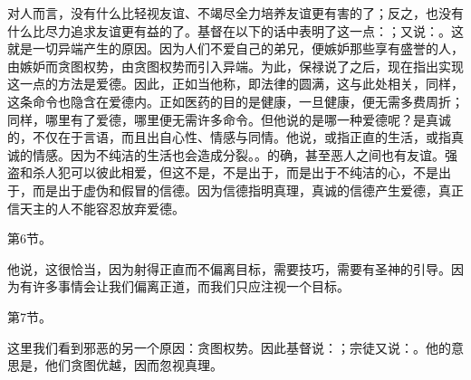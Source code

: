 \par

\par

对人而言，没有什么比轻视友谊、不竭尽全力培养友谊更有害的了；反之，也没有什么比尽力追求友谊更有益的了。基督在以下的话中表明了这一点：\newline{}；又说：\newline{}。这就是一切异端产生的原因。因为人们不爱自己的弟兄，便嫉妒那些享有盛誉的人，由嫉妒而贪图权势，由贪图权势而引入异端。为此，保禄说了之后，现在指出实现这一点的方法是爱德。因此，正如当他称\newline{}，即法律的圆满，这与此处相关，同样，这条命令也隐含在爱德内。正如医药的目的是健康，一旦健康，便无需多费周折；同样，哪里有了爱德，哪里便无需许多命令。但他说的是哪一种爱德呢？是真诚的，不仅在于言语，而且出自心性、情感与同情。他说，或指正直的生活，或指真诚的情感。因为不纯洁的生活也会造成分裂。\newline{}。的确，甚至恶人之间也有友谊。强盗和杀人犯可以彼此相爱，但这不是，不是出于，而是出于不纯洁的心，不是出于，而是出于虚伪和假冒的信德。因为信德指明真理，真诚的信德产生爱德，真正信天主的人不能容忍放弃爱德。\par

第6节。\newline{}\par

他说，这很恰当，因为射得正直而不偏离目标，需要技巧，需要有圣神的引导。因为有许多事情会让我们偏离正道，而我们只应注视一个目标。\par

第7节。\newline{}\par

这里我们看到邪恶的另一个原因：贪图权势。因此基督说：\newline{}；宗徒又说：\newline{}。他的意思是，他们贪图优越，因而忽视真理。\par

